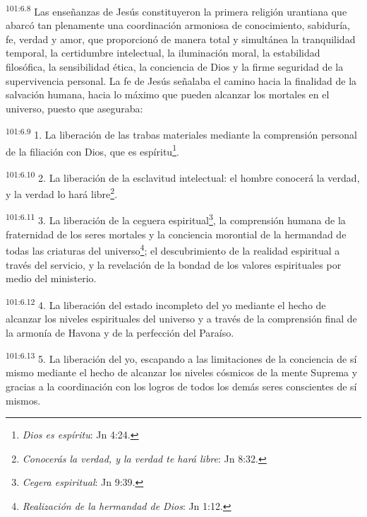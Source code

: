 \documentclass[twoside, 11pt]{book}
\begin{document}
\par
\textsuperscript{101:6.8} Las enseñanzas de Jesús constituyeron la primera religión urantiana que abarcó tan plenamente una coordinación armoniosa de conocimiento, sabiduría, fe, verdad y amor, que proporcionó de manera total y simultánea la tranquilidad temporal, la certidumbre intelectual, la iluminación moral, la estabilidad filosófica, la sensibilidad ética, la conciencia de Dios y la firme seguridad de la supervivencia personal. La fe de Jesús señalaba el camino hacia la finalidad de la salvación humana, hacia lo máximo que pueden alcanzar los mortales en el universo, puesto que aseguraba:

\par
\textsuperscript{101:6.9} 1. La liberación de las trabas materiales mediante la comprensión personal de la filiación con Dios, que es espíritu\footnote{\textit{Dios es espíritu}: Jn 4:24.}.

\par
\textsuperscript{101:6.10} 2. La liberación de la esclavitud intelectual: el hombre conocerá la verdad, y la verdad lo hará libre\footnote{\textit{Conocerás la verdad, y la verdad te hará libre}: Jn 8:32.}.

\par
\textsuperscript{101:6.11} 3. La liberación de la ceguera espiritual\footnote{\textit{Cegera espiritual}: Jn 9:39.}, la comprensión humana de la fraternidad de los seres mortales y la conciencia morontial de la hermandad de todas las criaturas del universo\footnote{\textit{Realización de la hermandad de Dios}: Jn 1:12.}; el descubrimiento de la realidad espiritual a través del servicio, y la revelación de la bondad de los valores espirituales por medio del ministerio.

\par
\textsuperscript{101:6.12} 4. La liberación del estado incompleto del yo mediante el hecho de alcanzar los niveles espirituales del universo y a través de la comprensión final de la armonía de Havona y de la perfección del Paraíso.

\par
\textsuperscript{101:6.13} 5. La liberación del yo, escapando a las limitaciones de la conciencia de sí mismo mediante el hecho de alcanzar los niveles cósmicos de la mente Suprema y gracias a la coordinación con los logros de todos los demás seres conscientes de sí mismos.
\end{document}

